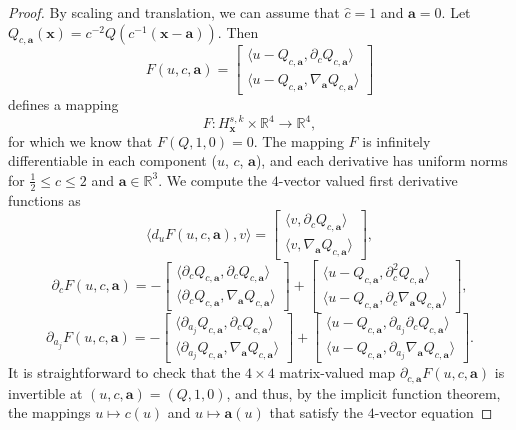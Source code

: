 \documentclass[12pt,letterpaper]{amsart}
\newcommand{\la}{\langle}
\newcommand{\ra}{\rangle}
\theoremstyle{remark}
\numberwithin{equation}{section}
\numberwithin{theorem}{section}
\numberwithin{table}{section}
\begin{document}
\begin{proof}
By scaling and translation, we can assume that $\hat c=1$ and $\hat{\mathbf{a}}=0$.
Let $Q_{c,\mathbf{a}}(\mathbf{x}) = c^{-2}Q(c^{-1}(\mathbf{x}-\mathbf{a}))$.  Then
$$
F(u,c,\mathbf{a}) = \begin{bmatrix}  \la u - Q_{c,\mathbf{a}}, \partial_c Q_{c,\mathbf{a}} \ra  \\  \la u - Q_{c,\mathbf{a}}, \nabla_{\mathbf{a}} Q_{c,\mathbf{a}} \ra \end{bmatrix}
$$
defines a mapping
$$
F: H_{\mathbf{x}}^{s,k} \times \mathbb{R}^4 \to \mathbb{R}^4,
$$
for which we know that $F(Q,1,0)=0$.  The mapping $F$ is infinitely differentiable in each component ($u$, $c$, $\mathbf{a}$), and each derivative has uniform norms for $\frac12\leq c \leq 2$ and $\mathbf{a}\in \mathbb{R}^3$.  We compute  the $4$-vector valued first derivative functions as
$$
\la d_u F(u,c,\mathbf{a}), v\ra  = \begin{bmatrix}  \la  v , \partial_c Q_{c,\mathbf{a}} \ra  \\  \la v, \nabla_{\mathbf{a}} Q_{c,\mathbf{a}} \ra \end{bmatrix},
$$
$$
\partial_c F(u,c,\mathbf{a})  = -\begin{bmatrix}  \la  \partial_c Q_{c,\mathbf{a}} , \partial_c Q_{c,\mathbf{a}} \ra  \\  \la \partial_c Q_{c,\mathbf{a}}, \nabla_{\mathbf{a}} Q_{c,\mathbf{a}} \ra \end{bmatrix}+ \begin{bmatrix}  \la u - Q_{c,\mathbf{a}}, \partial_c^2 Q_{c,\mathbf{a}} \ra  \\  \la u - Q_{c,\mathbf{a}}, \partial_c \nabla_{\mathbf{a}} Q_{c,\mathbf{a}} \ra \end{bmatrix},
$$
$$
\partial_{a_j} F(u,c,\mathbf{a})  = -\begin{bmatrix}  \la \partial_{a_j}   Q_{c,\mathbf{a}} , \partial_c Q_{c,\mathbf{a}} \ra  \\  \la \partial_{a_j} Q_{c,\mathbf{a}}, \nabla_{\mathbf{a}} Q_{c,\mathbf{a}} \ra \end{bmatrix}+ \begin{bmatrix}  \la u - Q_{c,\mathbf{a}}, \partial_{a_j}\partial_c Q_{c,\mathbf{a}} \ra  \\  \la u - Q_{c,\mathbf{a}}, \partial_{a_j} \nabla_{\mathbf{a}} Q_{c,\mathbf{a}} \ra \end{bmatrix}.
$$
It is straightforward to check that the $4\times 4$ matrix-valued map $\partial_{c,\mathbf{a}}F(u,c,\mathbf{a})$ is invertible at $(u,c, \mathbf{a}) = (Q,1,0)$, and thus, by the implicit function theorem, the mappings  $u \mapsto c(u)$ and $u \mapsto \mathbf{a}(u)$ that satisfy the $4$-vector equation

\end{proof}
\end{document}

